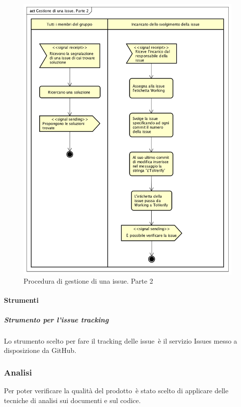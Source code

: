 \documentclass[../NormeProgetto.text]{subfiles}
\begin{document}
				\begin{figure}[H]
					\centering
					\includegraphics[scale= 0.75, width=\textwidth]{sections/img/gestioneIssueP2.png}
					\caption{Procedura di gestione di una issue. Parte 2}\label{fig:Procedura di gestione di una nuova issue parte 2} 
				\end{figure}

		
\newpage
	\paragraph{Strumenti} \label{sec:Strumenti}
			\subparagraph{Strumento per l'issue tracking} \label{par:IssueTrk GitHub}
				Lo strumento scelto per fare il tracking delle issue\g\ è il servizio Issues messo a disposizione da GitHub\g. 

	\subsubsection{Analisi}
				Per poter verificare la qualità del prodotto\g\ è stato scelto di applicare delle tecniche di analisi sui documenti e sul codice. 
\end{document}
